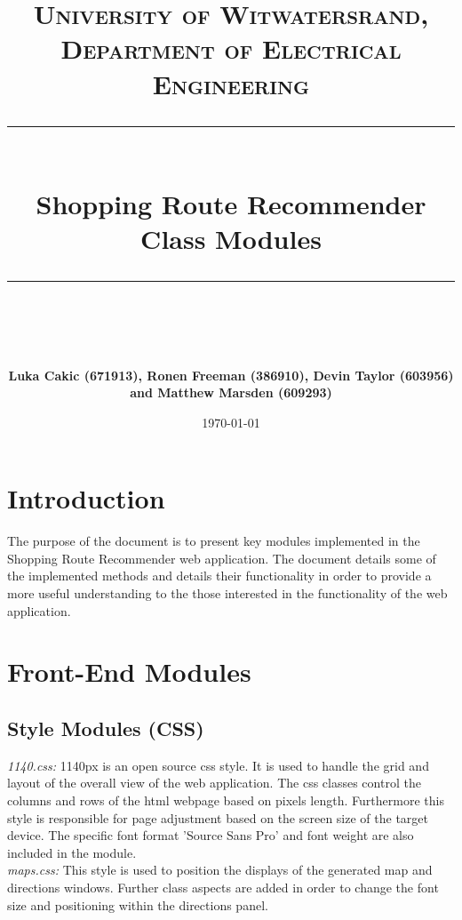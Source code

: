 \documentclass[10pt, a4paper, onecolumn]{scrartcl}
\newcommand{\horrule}[1]{\rule{\linewidth}{#1}}
\begin{document}
	
	\title{\normalfont \normalsize
		\textsc{University of Witwatersrand, Department of Electrical Engineering} \\ [10pt]
		\horrule{0.5pt} \\ [10pt]
		\huge Shopping Route Recommender Class Modules \\
		\horrule{2pt} \\ [10pt]}
	\author{\textbf{\normalsize{Luka Cakic (671913), Ronen Freeman (386910), Devin Taylor (603956) and Matthew Marsden (609293)}} \\ [10pt]}
	\date {\normalsize \today}
	
	\maketitle
	
	\section{Introduction}
	
		 The purpose of the document is to present key modules implemented in the Shopping Route Recommender web application. The document details some of the implemented methods and details their functionality in order to provide a more useful understanding to the those interested in the functionality of the web application. \\
		 
	\section{Front-End Modules}
	
		\subsection{Style Modules (CSS)}
		
		\textit{1140.css:}  1140px is an open source css style. It is used to handle the grid and layout of the overall view of the web application. The css classes control the columns and rows of the html webpage based on pixels length. Furthermore this style is responsible for page adjustment based on the screen size of the target device. The specific font format 'Source Sans Pro' and font weight are also included in the module.\\
		
		\textit{maps.css:} This style is used to position the displays of the generated map and directions windows. Further class aspects are added in order to change the font size and positioning within the directions panel.\\
		
\end{document}
